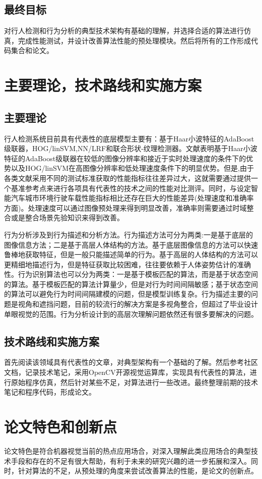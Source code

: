 \documentclass[12pt]{article}
\begin{document}
\subsection{最终目标}
对行人检测和行为分析的典型技术架构有基础的理解，并选择合适的算法进行仿真，完成性能测试，并设计改善算法性能的预处理模块。然后将所有的工作形成代码集合和论文。
\section{主要理论，技术路线和实施方案}
\subsection{主要理论}
行人检测系统目前具有代表性的底层模型主要有：基于Haar小波特征的AdaBoost级联器，HOG/linSVM,NN/LRF和联合形状-纹理检测器。文献表明基于Haar小波特征的AdaBoost级联器在较低的图像分辨率和接近于实时处理速度的条件下的优势以及HOG/linSVM在高图像分辨率和低处理速度条件下的明显优势。但是,由于各类文献采用不同的测试标准获取的性能指标往往差异过大，这就需要通过提供一个基准参考点来进行各项具有代表性的技术之间的性能对比测评。同时，与设定智能汽车城市环境行驶车载性能指标相比还存在巨大的性能差异(处理速度和准确率方面)。处理速度可以通过图像预处理来得到明显改善，准确率则需要通过时域整合或是整合场景先验知识来得到改善。

行为分析涉及到行为描述和分析方法。行为描述方法可分为两类:一是基于底层的图像信息方法；二是基于高层人体结构的方法。基于底层图像信息的方法可以快速鲁棒地获取特征，但是一般只能描述简单的行为。基于高层的人体结构的方法可以更精细地描述行为，但是特征获取比较困难，往往要依赖于人体姿势估计的准确性。行为识别算法也可以分为两类：一是基于模板匹配的算法，而是基于状态空间的算法。基于模板匹配的算法计算量少，但是对行为时间间隔敏感；基于状态空间的算法可以避免行为时间间隔建模的问题，但是模型训练复杂。行为描述主要的问题是视角和遮挡问题，目前的较流行的解决方案是多视角整合，但超过了毕业设计单眼视觉的范围。行为分析设计到的高层次理解问题依然还有很多要解决的问题。
\subsection{技术路线和实施方案}
首先阅读该领域具有代表性的文章，对典型架构有一个基础的了解。然后参考社区文档，记录技术笔记，采用OpenCV开源视觉运算库，实现具有代表性的算法，进行原始程序仿真，然后针对某些不足，对算法进行一些改进。最终整理前期的技术笔记和程序代码，形成论文。
\section{论文特色和创新点}
论文特色是符合机器视觉当前的热点应用场合，对深入理解此类应用场合的典型技术手段和存在的不足有很大帮助，有利于未来的研究兴趣的进一步拓展和深入。同时，针对算法的不足，从预处理的角度来尝试改善算法的性能，是论文的创新点。
\end{document}
